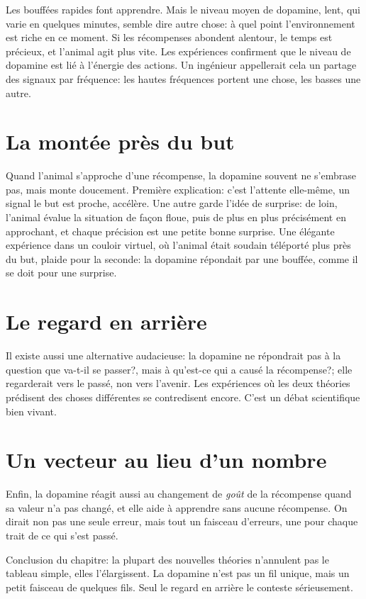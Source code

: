 Les bouffées rapides font apprendre. Mais le niveau moyen de dopamine, lent, qui varie en quelques minutes, semble dire autre chose: à quel point l'environnement est riche en ce moment. Si les récompenses abondent alentour, le temps est précieux, et l'animal agit plus vite. Les expériences confirment que le niveau de dopamine est lié à l'énergie des actions. Un ingénieur appellerait cela un partage des signaux par fréquence: les hautes fréquences portent une chose, les basses une autre.

\section*{La montée près du but}

Quand l'animal s'approche d'une récompense, la dopamine souvent ne s'embrase pas, mais monte doucement. Première explication: c'est l'attente elle-même, un signal \og le but est proche, accélère\fg{}. Une autre garde l'idée de surprise: de loin, l'animal évalue la situation de façon floue, puis de plus en plus précisément en approchant, et chaque précision est une petite bonne surprise. Une élégante expérience dans un couloir virtuel, où l'animal était soudain téléporté plus près du but, plaide pour la seconde: la dopamine répondait par une bouffée, comme il se doit pour une surprise.

\section*{Le regard en arrière}

Il existe aussi une alternative audacieuse: la dopamine ne répondrait pas à la question \og que va-t-il se passer?\fg{}, mais à \og qu'est-ce qui a causé la récompense?\fg{}; elle regarderait vers le passé, non vers l'avenir. Les expériences où les deux théories prédisent des choses différentes se contredisent encore. C'est un débat scientifique bien vivant.

\section*{Un vecteur au lieu d'un nombre}

Enfin, la dopamine réagit aussi au changement de \emph{goût} de la récompense quand sa valeur n'a pas changé, et elle aide à apprendre sans aucune récompense. On dirait non pas une seule erreur, mais tout un faisceau d'erreurs, une pour chaque trait de ce qui s'est passé.

Conclusion du chapitre: la plupart des nouvelles théories n'annulent pas le tableau simple, elles l'élargissent. La dopamine n'est pas un fil unique, mais un petit faisceau de quelques fils. Seul le \og regard en arrière\fg{} le conteste sérieusement.

